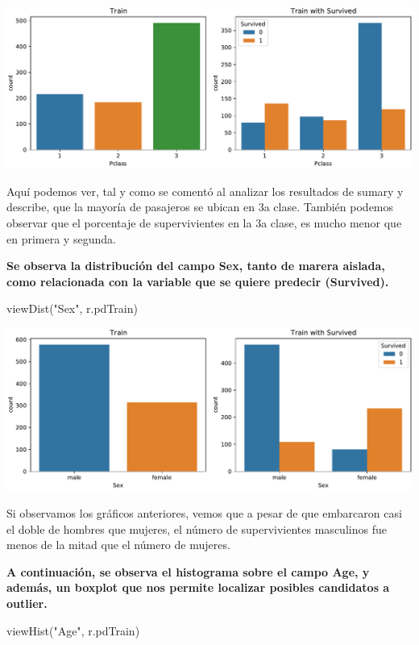 \documentclass[
]{article}
\newenvironment{Shaded}{\begin{snugshade}}{\end{snugshade}}
\newcommand{\NormalTok}[1]{\textcolor[rgb]{0.80,0.80,0.80}{#1}}
\newcommand{\StringTok}[1]{\textcolor[rgb]{0.80,0.58,0.58}{#1}}
\begin{document}
\includegraphics{m2851_PRA2_aruizplaza_rcotillas_files/figure-latex/unnamed-chunk-6-1.pdf}

Aquí podemos ver, tal y como se comentó al analizar los resultados de
sumary y describe, que la mayoría de pasajeros se ubican en 3a clase.
También podemos observar que el porcentaje de supervivientes en la 3a
clase, es mucho menor que en primera y segunda.

\textbf{Se observa la distribución del campo Sex, tanto de marera
aislada, como relacionada con la variable que se quiere predecir
(Survived).}

\begin{Shaded}
\begin{Highlighting}[]
\NormalTok{viewDist(}\StringTok{"Sex"}\NormalTok{, r.pdTrain)}
\end{Highlighting}
\end{Shaded}

\includegraphics{m2851_PRA2_aruizplaza_rcotillas_files/figure-latex/unnamed-chunk-7-1.pdf}

Si observamos los gráficos anteriores, vemos que a pesar de que
embarcaron casi el doble de hombres que mujeres, el número de
supervivientes masculinos fue menos de la mitad que el número de
mujeres.

\textbf{A continuación, se observa el histograma sobre el campo Age, y
además, un boxplot que nos permite localizar posibles candidatos a
outlier.}

\begin{Shaded}
\begin{Highlighting}[]
\NormalTok{viewHist(}\StringTok{"Age"}\NormalTok{, r.pdTrain)}
\end{Highlighting}
\end{Shaded}
\end{document}
